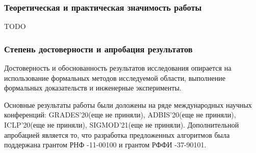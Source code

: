 \subsubsection*{\large{Теоретическая и практическая значимость работы}}
TODO




\subsubsection*{\large{Степень достоверности и апробация результатов}}
Достоверность и обоснованность результатов исследования опирается на использование формальных методов исследуемой области, выполнение формальных доказательств и инженерные эксперименты.

Основные результаты работы были доложены на ряде международных научных конференций: GRADES'20(еще не приняли), ADBIS’20(еще не приняли), ICLP'20(еще не приняли), SIGMOD'21(еще не приняли). Дополнительной апробацией является то, что разработка предложенных алгоритмов была поддержана грантом РНФ -11-00100 и грантом РФФИ -37-90101.

